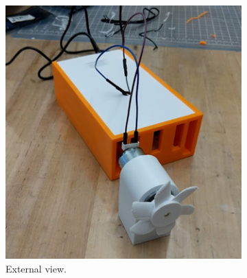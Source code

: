 \documentclass[11pt]{article}
\begin{document}
\begin{figure}
    \centering
      \begin{subfigure}{0.43\textwidth}
        \includegraphics[width=\linewidth]{finalPrototypeOutside}
        \caption{External view.}
        \label{finalPrototypeOutside}
      \end{subfigure}
      \begin{subfigure}{0.34\textwidth}

\end{subfigure}
\end{figure}
\end{document}
